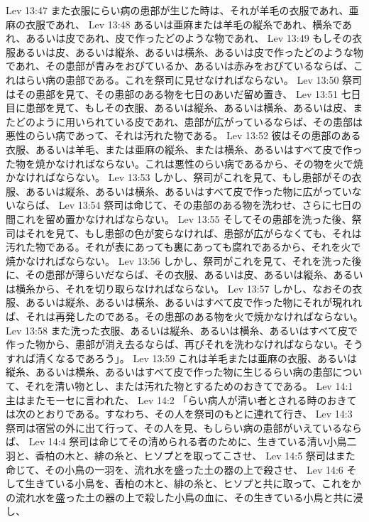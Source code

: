 Lev 13:47  また衣服にらい病の患部が生じた時は、それが羊毛の衣服であれ、亜麻の衣服であれ、
Lev 13:48  あるいは亜麻または羊毛の縦糸であれ、横糸であれ、あるいは皮であれ、皮で作ったどのような物であれ、
Lev 13:49  もしその衣服あるいは皮、あるいは縦糸、あるいは横糸、あるいは皮で作ったどのような物であれ、その患部が青みをおびているか、あるいは赤みをおびているならば、これはらい病の患部である。これを祭司に見せなければならない。
Lev 13:50  祭司はその患部を見て、その患部のある物を七日のあいだ留め置き、
Lev 13:51  七日目に患部を見て、もしその衣服、あるいは縦糸、あるいは横糸、あるいは皮、またどのように用いられている皮であれ、患部が広がっているならば、その患部は悪性のらい病であって、それは汚れた物である。
Lev 13:52  彼はその患部のある衣服、あるいは羊毛、または亜麻の縦糸、または横糸、あるいはすべて皮で作った物を焼かなければならない。これは悪性のらい病であるから、その物を火で焼かなければならない。
Lev 13:53  しかし、祭司がこれを見て、もし患部がその衣服、あるいは縦糸、あるいは横糸、あるいはすべて皮で作った物に広がっていないならば、
Lev 13:54  祭司は命じて、その患部のある物を洗わせ、さらに七日の間これを留め置かなければならない。
Lev 13:55  そしてその患部を洗った後、祭司はそれを見て、もし患部の色が変らなければ、患部が広がらなくても、それは汚れた物である。それが表にあっても裏にあっても腐れであるから、それを火で焼かなければならない。
Lev 13:56  しかし、祭司がこれを見て、それを洗った後に、その患部が薄らいだならば、その衣服、あるいは皮、あるいは縦糸、あるいは横糸から、それを切り取らなければならない。
Lev 13:57  しかし、なおその衣服、あるいは縦糸、あるいは横糸、あるいはすべて皮で作った物にそれが現れれば、それは再発したのである。その患部のある物を火で焼かなければならない。
Lev 13:58  また洗った衣服、あるいは縦糸、あるいは横糸、あるいはすべて皮で作った物から、患部が消え去るならば、再びそれを洗わなければならない。そうすれば清くなるであろう」。
Lev 13:59  これは羊毛または亜麻の衣服、あるいは縦糸、あるいは横糸、あるいはすべて皮で作った物に生じるらい病の患部について、それを清い物とし、または汚れた物とするためのおきてである。
Lev 14:1  主はまたモーセに言われた、
Lev 14:2  「らい病人が清い者とされる時のおきては次のとおりである。すなわち、その人を祭司のもとに連れて行き、
Lev 14:3  祭司は宿営の外に出て行って、その人を見、もしらい病の患部がいえているならば、
Lev 14:4  祭司は命じてその清められる者のために、生きている清い小鳥二羽と、香柏の木と、緋の糸と、ヒソプとを取ってこさせ、
Lev 14:5  祭司はまた命じて、その小鳥の一羽を、流れ水を盛った土の器の上で殺させ、
Lev 14:6  そして生きている小鳥を、香柏の木と、緋の糸と、ヒソプと共に取って、これをかの流れ水を盛った土の器の上で殺した小鳥の血に、その生きている小鳥と共に浸し、
